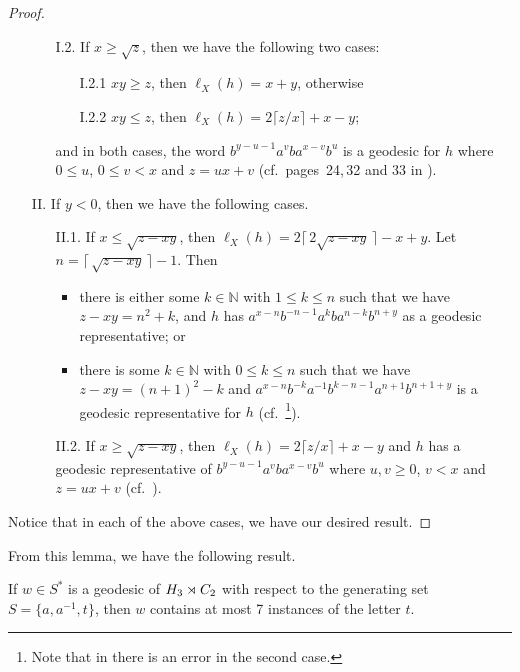 \begin{proof}
\begin{itemize}
\begin{itemize}
			
			\item[I.2.]
			If $x \geq \sqrt{z}$, then we have the following two cases:
			\begin{itemize}
				\item[I.2.1] $xy \geq z$, then $\ell_X(h) = x+y$, otherwise
				\item[I.2.2] $xy \leq z$, then $\ell_X(h) = 2 \lceil z/x \rceil + x - y$;
			\end{itemize}
			and in both cases, the word $b^{y-u-1} a^v b a^{x-v} b^u$ is a geodesic for $h$ where $0 \leq u$, $0 \leq v < x$ and $z = ux+v$ (cf.~pages~24,\,32 and 33 in \cite{blachere2003}).
		\end{itemize}
		
		\item[II.]
		If $y < 0$, then we have the following cases.
		\begin{itemize}
			\item[II.1.] If $x \leq \sqrt{z - xy}$, then $\ell_X(h) = 2\lceil\, 2\sqrt{z-xy}\,\rceil - x + y$.
			Let $n = \lceil \, \sqrt{z-xy}\,\rceil-1$.
			Then
			\begin{itemize}
				\item 
				there is either some $k \in \mathbb{N}$ with $1 \leq k \leq n$ such that we have $z-xy = n^2+k$, and $h$ has  $a^{x-n} b^{-n-1} a^k b a^{n-k} b^{n+y}$ as a geodesic representative; or
				\item
				there is some $k \in \mathbb{N}$ with $0 \leq k \leq n$ such that we have $z-xy = (n+1)^2-k$ and $a^{x-n} b^{-k} a^{-1} b^{k-n-1} a^{n+1} b^{n+1+y}$ is a geodesic representative for $h$
				(cf.~\cite[p.~24]{blachere2003}\footnote{Note that in \cite{blachere2003} there is an error in the second case.}).
			\end{itemize}
			\item[II.2.] If $x \geq \sqrt{z - xy}$, then $\ell_X(h) = 2 \lceil z/x \rceil + x - y$ and 
			$h$ has  a geodesic representative of $b^{y-u-1} a^v b a^{x-v} b^u$
			where $u,v \geq 0$, $v < x$ and $z = ux+v$ (cf.~\cite[pp.~24\,\&\,33]{blachere2003}).
		\end{itemize}
	\end{itemize}
	Notice that in each of the above cases, we have our desired result.
\end{proof}

From this lemma, we  have the following result. 

\begin{corollary}\label{cor:max-7-t}
	If $w \in S^*$ is a geodesic of $H_3 \rtimes C_2$ with respect to the generating set $S = \{a,a^{-1},t\}$, then $w$  contains at most 7 instances of the letter $t$.
\end{corollary}

